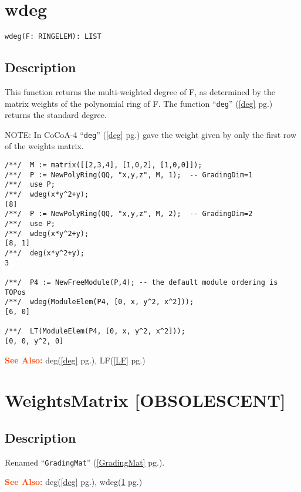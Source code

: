 \documentclass[a4paper]{mybook}
\newenvironment{command}{}{} %
\newcommand\SeeAlso{\par\textcolor{OrangeRed}{\textbf{\large See Also: }}}
\begin{document}
\section{wdeg}
\label{wdeg}
\begin{command} %


\begin{Verbatim}[label=syntax, rulecolor=\color{MidnightBlue},
frame=single]
wdeg(F: RINGELEM): LIST
\end{Verbatim}


\subsection*{Description}

This function returns the multi-weighted degree of F, as determined by
the matrix weights of the polynomial ring of F.  The function ``\verb&deg&'' (\ref{deg} pg.\pageref{deg})
returns the standard degree.
\par 
NOTE: In CoCoA-4 ``\verb&deg&'' (\ref{deg} pg.\pageref{deg}) gave the weight given by only the first row
of the weights matrix.
\begin{Verbatim}[label=example, rulecolor=\color{PineGreen}, frame=single]
/**/  M := matrix([[2,3,4], [1,0,2], [1,0,0]]);
/**/  P := NewPolyRing(QQ, "x,y,z", M, 1);  -- GradingDim=1
/**/  use P;
/**/  wdeg(x*y^2+y);
[8]
/**/  P := NewPolyRing(QQ, "x,y,z", M, 2);  -- GradingDim=2
/**/  use P;
/**/  wdeg(x*y^2+y);
[8, 1]
/**/  deg(x*y^2+y);
3

/**/  P4 := NewFreeModule(P,4); -- the default module ordering is TOPos
/**/  wdeg(ModuleElem(P4, [0, x, y^2, x^2]));
[6, 0]

/**/  LT(ModuleElem(P4, [0, x, y^2, x^2]));
[0, 0, y^2, 0]
\end{Verbatim}


\SeeAlso %
  deg(\ref{deg} pg.\pageref{deg}), 
    LF(\ref{LF} pg.\pageref{LF})
\end{command} %

\section{WeightsMatrix [OBSOLESCENT]}
\label{WeightsMatrix [OBSOLESCENT]}
\begin{command} %



\subsection*{Description}

Renamed ``\verb&GradingMat&'' (\ref{GradingMat} pg.\pageref{GradingMat}).

\SeeAlso %
  deg(\ref{deg} pg.\pageref{deg}), 
    wdeg(\ref{wdeg} pg.\pageref{wdeg})
\end{command} %
\end{document}
